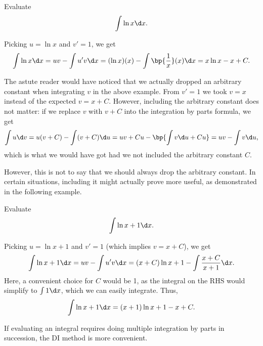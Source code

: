 \begin{sample}
    Evaluate \[\int \ln x \d x.\]
\end{sample}
\begin{sampans}
    Picking $u = \ln x$ and $v' = 1$, we get \[\int \ln x \d x = uv - \int u' v \d x = (\ln x)(x) - \int \bp{\frac1x} (x) \d x = x\ln x - x + C.\]
\end{sampans}

The astute reader would have noticed that we actually dropped an arbitrary constant when integrating $v$ in the above example. From $v' = 1$ we took $v = x$ instead of the expected $v = x + C$. However, including the arbitrary constant does not matter: if we replace $v$ with $v + C$ into the integration by parts formula, we get \[\int u \d v = u(v + C) - \int (v + C) \d u = uv + Cu - \bp{\int v \d u + Cu} = uv - \int v \d u,\] which is what we would have got had we not included the arbitrary constant $C$.

However, this is not to say that we should always drop the arbitrary constant. In certain situations, including it might actually prove more useful, as demonstrated in the following example.

\begin{sample}
    Evaluate \[\int \ln{x + 1} \d x.\]
\end{sample}
\begin{sampans}
    Picking $u = \ln{x+1}$ and $v' = 1$ (which implies $v = x + C$), we get \[\int \ln{x+1} \d x = uv - \int u' v \d x = (x + C) \ln{x+1} - \int \frac{x+C}{x+1} \d x.\] Here, a convenient choice for $C$ would be 1, as the integral on the RHS would simplify to $\int 1 \d x$, which we can easily integrate. Thus, \[\int \ln{x+1} \d x = (x+1) \ln{x+1} - x + C.\]
\end{sampans}

If evaluating an integral requires doing multiple integration by parts in succession, the DI method is more convenient.

